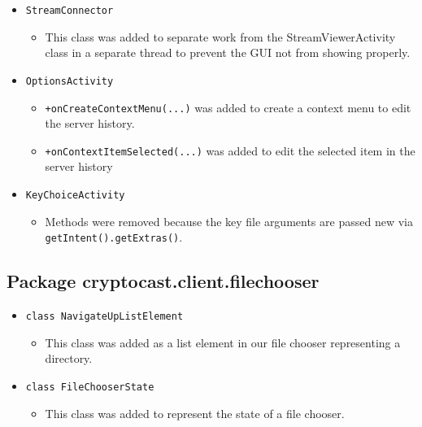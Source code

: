 \documentclass[a4paper,10pt]{scrartcl}
\begin{document}
\begin{itemize}
  \item \lstinline|StreamConnector|
  \begin{itemize}
  \item This class was added to separate work from the StreamViewerActivity class
  in a separate thread to prevent the GUI not from showing properly.
  \end{itemize}

  \item \lstinline|OptionsActivity|
  \begin{itemize}
  \item \lstinline|+onCreateContextMenu(...)| was added to 
  create a context menu to edit the server history.
  \item \lstinline|+onContextItemSelected(...)| was added to edit the selected item in the server history
    \end{itemize}

  \item \lstinline|KeyChoiceActivity|
  \begin{itemize}
  \item Methods were removed because the key file arguments are passed new via \lstinline|getIntent().getExtras()|. 
  \end{itemize}



\end{itemize}


\subsection{Package cryptocast.client.filechooser}

\begin{itemize}

 \item \lstinline|class NavigateUpListElement|
  \begin{itemize}
   \item This class was added as a list element in our file chooser representing a directory.
  \end{itemize}

    \item \lstinline|class FileChooserState|
  \begin{itemize}
   \item This class was added to represent the state of a file chooser.
  \end{itemize}

\end{itemize}
\end{document}

